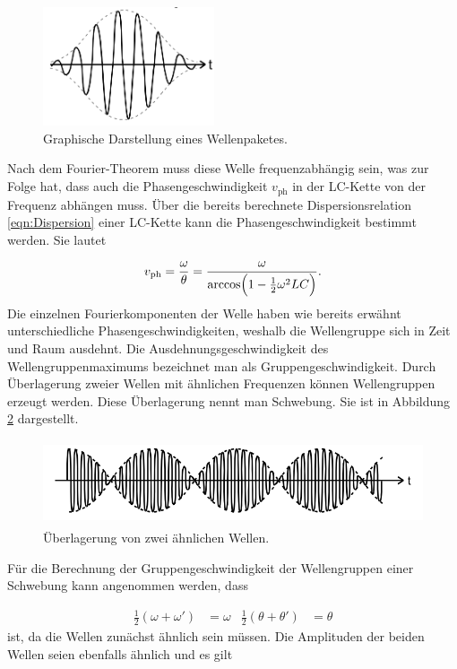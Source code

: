 \begin{figure}
  \centering
  \includegraphics[height = 3.5cm]{Wellengruppe.png}
  \caption{Graphische Darstellung eines Wellenpaketes.}
  \label{fig:WP}
\end{figure}

Nach dem Fourier-Theorem
muss diese Welle frequenzabhängig sein, was zur Folge hat, dass auch die
Phasengeschwindigkeit $v_\text{ph}$ in der LC-Kette von der Frequenz abhängen
muss.
Über die bereits berechnete Dispersionsrelation \eqref{eqn:Dispersion} einer
LC-Kette kann die Phasengeschwindigkeit bestimmt werden.
Sie lautet

\begin{equation}
  v_\text{ph} = \frac{\omega}{\theta} = \frac{\omega}{\arccos \Bigl(
  1-\frac{1}{2}\omega^2LC\Bigr)}.
\end{equation}
Die einzelnen Fourierkomponenten der Welle haben wie bereits erwähnt
unterschiedliche Phasengeschwindigkeiten, weshalb die Wellengruppe sich in Zeit
und Raum ausdehnt. Die Ausdehnungsgeschwindigkeit des Wellengruppenmaximums
bezeichnet man als Gruppengeschwindigkeit.
Durch Überlagerung zweier Wellen mit ähnlichen Frequenzen können Wellengruppen
erzeugt werden. Diese Überlagerung nennt man Schwebung. Sie ist in Abbildung
\ref{fig:Schweb} dargestellt.

\begin{figure}
  \centering
  \includegraphics[height = 2.5cm]{Schwebung.png}
  \caption{Überlagerung von zwei ähnlichen Wellen.}
  \label{fig:Schweb}
\end{figure}

Für die Berechnung der Gruppengeschwindigkeit der Wellengruppen einer Schwebung
kann angenommen werden, dass

\begin{align}
\frac{1}{2}(\omega + \omega') & = \omega & \frac{1}{2}(\theta + \theta') &
= \theta
\label{eqn:SchwebungBedingung}
\end{align}
ist, da die Wellen zunächst ähnlich sein müssen.
Die Amplituden der beiden Wellen seien ebenfalls ähnlich und es gilt

